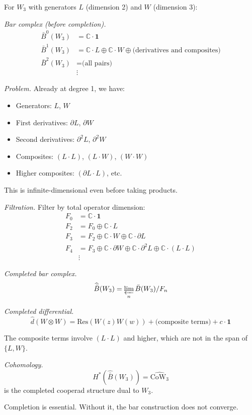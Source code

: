 \begin{example}\label{ex:w3-bar-completion}
For $W_3$ with generators $L$ (dimension 2) and $W$ (dimension 3):

\emph{Bar complex (before completion).}
\begin{align}
\bar{B}^0(W_3) &= \mathbb{C} \cdot \mathbf{1} \\
\bar{B}^1(W_3) &= \mathbb{C} \cdot L \oplus \mathbb{C} \cdot W \oplus \text{(derivatives and composites)} \\
\bar{B}^2(W_3) &= \text{(all pairs)} \\
&\vdots
\end{align}

\emph{Problem.} Already at degree 1, we have:
\begin{itemize}
\item Generators: $L$, $W$
\item First derivatives: $\partial L$, $\partial W$
\item Second derivatives: $\partial^2 L$, $\partial^2 W$
\item Composites: $(L \cdot L)$, $(L \cdot W)$, $(W \cdot W)$
\item Higher composites: $(\partial L \cdot L)$, etc.
\end{itemize}

This is infinite-dimensional even before taking products.

\emph{Filtration.} Filter by total operator dimension:
\begin{align}
F_0 &= \mathbb{C} \cdot \mathbf{1} \\
F_2 &= F_0 \oplus \mathbb{C} \cdot L \\
F_3 &= F_2 \oplus \mathbb{C} \cdot W \oplus \mathbb{C} \cdot \partial L \\
F_4 &= F_3 \oplus \mathbb{C} \cdot \partial W \oplus \mathbb{C} \cdot \partial^2 L 
\oplus \mathbb{C} \cdot (L \cdot L) \\
&\vdots
\end{align}

\emph{Completed bar complex.}
\[\widehat{\bar{B}}(W_3) = \varprojlim_n \bar{B}(W_3)/F_n\]

\emph{Completed differential.}
\[\widehat{d}(W \otimes W) = \text{Res}(W(z)W(w)) + \text{(composite terms)} + c \cdot \mathbf{1}\]

The composite terms involve $(L \cdot L)$ and higher, which are not in the span of $\{L, W\}$.

\emph{Cohomology.}
\[H^*(\widehat{\bar{B}}(W_3)) = \widehat{\text{CoW}_3}\]
is the completed cooperad structure dual to $W_3$.

Completion is essential. Without it, the bar construction does not converge.
\end{example}

